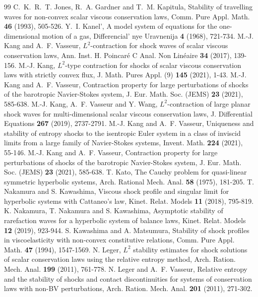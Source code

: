 \documentclass[10pt,reqno]{amsart}
\numberwithin{equation}{section}
\begin{document}
\begin{thebibliography}{99}
		C.~K.~R.~T. Jones, R.~A. Gardner and T.~M. Kapitula, Stability of travelling waves for non-convex scalar viscous conservation laws, Comm. Pure Appl. Math. {\bf 46} (1993), 505-526.
		Y.~I. Kanel', A model system of equations for the one-dimensional motion of a gas, Differencial' nye Uravnenija {\bf 4} (1968), 721-734.
		M.-J. Kang and A.~F. Vasseur, $L^2$-contraction for shock waves of scalar viscous conservation laws, Ann. Inst. H. Poincar\'e{} C Anal. Non Lin\'eaire {\bf 34} (2017), 139-156.
		M.-J. Kang, $L^2$-type contraction for shocks of scalar viscous conservation laws with strictly convex flux, J. Math. Pures Appl. (9) {\bf 145} (2021), 1-43.
		M.-J. Kang and A.~F. Vasseur, Contraction property for large perturbations of shocks of the barotropic Navier-Stokes system, J. Eur. Math. Soc. (JEMS) {\bf 23} (2021), 585-638.
		M.-J. Kang, A.~F. Vasseur and Y. Wang, $L^2$-contraction of large planar shock waves for multi-dimensional scalar viscous conservation laws, J. Differential Equations {\bf 267} (2019), 2737-2791.
		M.-J. Kang and A.~F. Vasseur, Uniqueness and stability of entropy shocks to the isentropic Euler system in a class of inviscid limits from a large family of Navier-Stokes systems, Invent. Math. {\bf 224} (2021), 55-146.
		M.-J. Kang and A.~F. Vasseur, Contraction property for large perturbations of shocks of the barotropic Navier-Stokes system, J. Eur. Math. Soc. (JEMS) {\bf 23} (2021), 585-638. 
		T. Kato, The Cauchy problem for quasi-linear symmetric hyperbolic systems, Arch. Rational Mech. Anal. {\bf 58} (1975), 181-205.
		T. Nakamura and S. Kawashima, Viscous shock profile and singular limit for hyperbolic systems with Cattaneo's law, Kinet. Relat. Models {\bf 11} (2018), 795-819.
		K. Nakamura, T. Nakamura and S. Kawashima, Asymptotic stability of rarefaction waves for a hyperbolic system of balance laws, Kinet. Relat. Models {\bf 12} (2019), 923-944.
		S. Kawashima and A. Matsumura, Stability of shock profiles in viscoelasticity with non-convex constitutive relations, Comm. Pure Appl. Math. {\bf 47} (1994), 1547-1569.
		N. Leger, $L^2$ stability estimates for shock solutions of scalar conservation laws using the relative entropy method, Arch. Ration. Mech. Anal. {\bf 199} (2011), 761-778.
		N. Leger and A.~F. Vasseur, Relative entropy and the stability of shocks and contact discontinuities for systems of conservation laws with non-BV perturbations, Arch. Ration. Mech. Anal. {\bf 201} (2011), 271-302.

\end{thebibliography}
\end{document}

